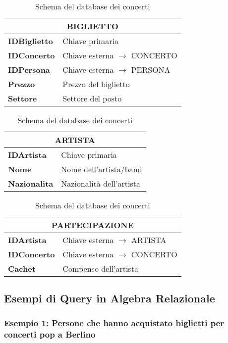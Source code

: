 \begin{table}[htbp]
		\begin{tabular}{|l|l|}
			\hline
			\multicolumn{2}{|c|}{\textbf{BIGLIETTO}} \\
			\hline
			\textbf{IDBiglietto} & Chiave primaria \\
			\textbf{IDConcerto} & Chiave esterna $\rightarrow$ CONCERTO \\
			\textbf{IDPersona} & Chiave esterna $\rightarrow$ PERSONA \\
			\textbf{Prezzo} & Prezzo del biglietto \\
			\textbf{Settore} & Settore del posto \\
			\hline
		\end{tabular}
		\hspace{1cm}
		\begin{tabular}{|l|l|}
			\hline
			\multicolumn{2}{|c|}{\textbf{ARTISTA}} \\
			\hline
			\textbf{IDArtista} & Chiave primaria \\
			\textbf{Nome} & Nome dell'artista/band \\
			\textbf{Nazionalita} & Nazionalità dell'artista \\
			\hline
		\end{tabular}
		
		\vspace{0.5cm}
		
		\begin{tabular}{|l|l|}
			\hline
			\multicolumn{2}{|c|}{\textbf{PARTECIPAZIONE}} \\
			\hline
			\textbf{IDArtista} & Chiave esterna $\rightarrow$ ARTISTA \\
			\textbf{IDConcerto} & Chiave esterna $\rightarrow$ CONCERTO \\
			\textbf{Cachet} & Compenso dell'artista \\
			\hline
		\end{tabular}
		\caption{Schema del database dei concerti}
	\end{table}
	
	\subsection{Esempi di Query in Algebra Relazionale}
	
	\subsubsection{Esempio 1: Persone che hanno acquistato biglietti per concerti pop a Berlino}
	
